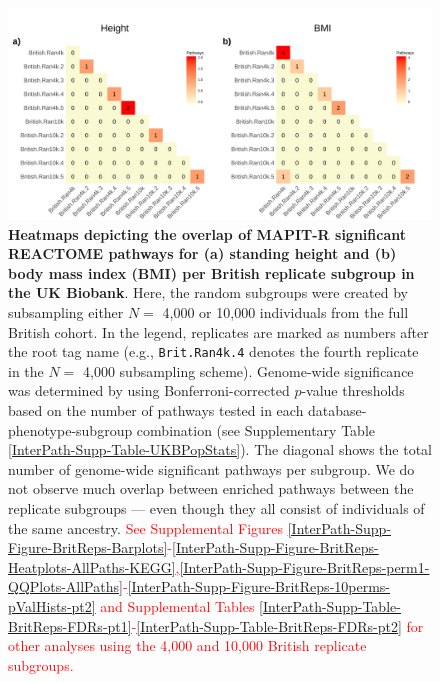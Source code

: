 \documentclass[10pt]{article}
\begin{document}
\begin{landscape}
\begin{figure}[htbp]
\centering
\includegraphics[scale=.2]{Images/Supp/InterPath_Supp_Figure_BritReps_Heatplots_REACTOME_vs5.png}
\caption{\textbf{Heatmaps depicting the overlap of MAPIT-R significant REACTOME pathways for (a) standing height and (b) body mass index (BMI) per British replicate subgroup in the UK Biobank}. Here, the random subgroups were created by subsampling either $N =$ 4,000 or 10,000 individuals from the full British cohort. In the legend, replicates are marked as numbers after the root tag name (e.g., \texttt{Brit.Ran4k.4} denotes the fourth replicate in the $N =$ 4,000 subsampling scheme). Genome-wide significance was determined by using Bonferroni-corrected $p$-value thresholds based on the number of pathways tested in each database-phenotype-subgroup combination (see Supplementary Table \ref{InterPath-Supp-Table-UKBPopStats}). The diagonal shows the total number of genome-wide significant pathways per subgroup. We do not observe much overlap between enriched pathways between the replicate subgroups --- even though they all consist of individuals of the same ancestry. \textcolor{red}{See Supplemental Figures \ref{InterPath-Supp-Figure-BritReps-Barplots}-\ref{InterPath-Supp-Figure-BritReps-Heatplots-AllPaths-KEGG},\ref{InterPath-Supp-Figure-BritReps-perm1-QQPlots-AllPaths}-\ref{InterPath-Supp-Figure-BritReps-10perms-pValHists-pt2} and Supplemental Tables \ref{InterPath-Supp-Table-BritReps-FDRs-pt1}-\ref{InterPath-Supp-Table-BritReps-FDRs-pt2} for other analyses using the 4,000 and 10,000 British replicate subgroups.}}
\label{InterPath-Supp-Figure-BritReps-Heatplots-AllPaths-REACTOME}
\end{figure}
\clearpage
\end{landscape}

\end{document}
